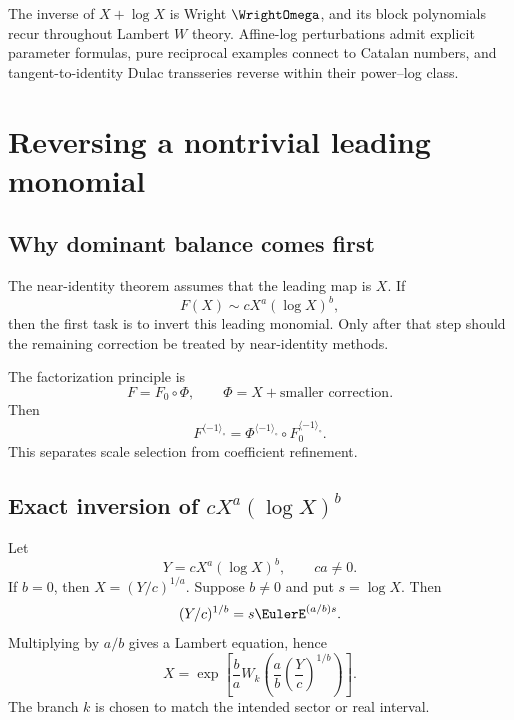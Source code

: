 \documentclass[11pt,openany]{book}
\theoremstyle{definition}
\theoremstyle{plain}
\theoremstyle{remark}
\newcommand{\invcomp}{^{\langle -1\rangle_{\circ}}}
\begin{document}
\begin{summarybox}
The inverse of \(X+\log X\) is Wright \(\WrightOmega\), and its block polynomials recur throughout Lambert \(W\) theory. Affine-log perturbations admit explicit parameter formulas, pure reciprocal examples connect to Catalan numbers, and tangent-to-identity Dulac transseries reverse within their power--log class.
\end{summarybox}

\chapter{Reversing a nontrivial leading monomial}\label{ch:leading-reversion}

\section{Why dominant balance comes first}
The near-identity theorem assumes that the leading map is \(X\). If
\[
 F(X)\sim cX^a(\log X)^b,
\]
then the first task is to invert this leading monomial. Only after that step should the remaining correction be treated by near-identity methods.

The factorization principle is
\begin{equation}\label{eq:leading-factorization-composition}
 F=F_0\circ\Phi,
 \qquad \Phi=X+\text{smaller correction}.
\end{equation}
Then
\begin{equation}\label{eq:factorized-inverse}
 F\invcomp=\Phi\invcomp\circ F_0\invcomp.
\end{equation}
This separates scale selection from coefficient refinement.

\section{Exact inversion of \texorpdfstring{\(cX^a(\log X)^b\)}{a power-log leading monomial}}
Let
\begin{equation}\label{eq:powerlog-monomial}
 Y=cX^a(\log X)^b,
 \qquad ca\ne0.
\end{equation}
If \(b=0\), then \(X=(Y/c)^{1/a}\). Suppose \(b\ne0\) and put \(s=\log X\). Then
\[
 (Y/c)^{1/b}=s \EulerE^{(a/b)s}.
\]
Multiplying by \(a/b\) gives a Lambert equation, hence
\begin{equation}\label{eq:powerlog-inverse-W}
 X=
 \exp\left[
 \frac ba W_k\left(
 \frac ab\left(\frac Yc\right)^{1/b}
 \right)
 \right].
\end{equation}
The branch \(k\) is chosen to match the intended sector or real interval.
\end{document}
